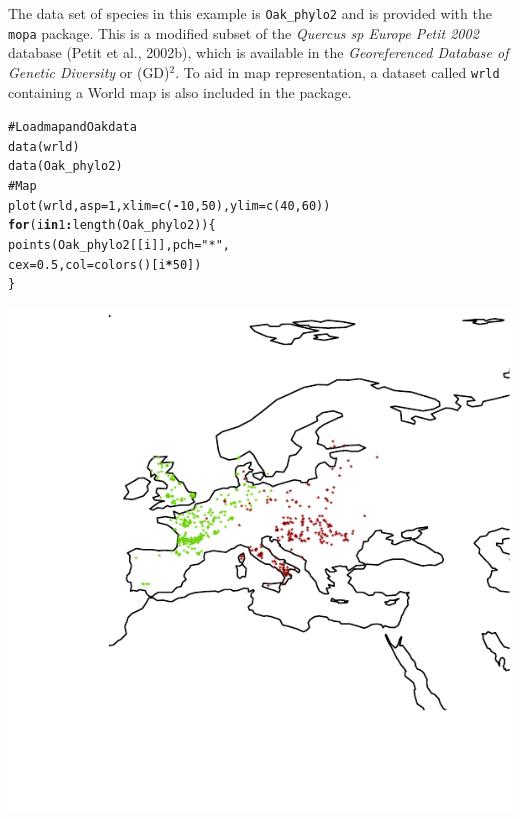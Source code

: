 \documentclass[10pt,a4paper]{article}\usepackage[]{graphicx}\usepackage[]{color}
\makeatletter
\def\maxwidth{ %
  \ifdim\Gin@nat@width>\linewidth
    \linewidth
  \else
    \Gin@nat@width
  \fi
}
\newcommand{\hlnum}[1]{\textcolor[rgb]{0.533,0,0.133}{#1}}%
\newcommand{\hlstr}[1]{\textcolor[rgb]{0.667,0.267,0}{#1}}%
\newcommand{\hlcom}[1]{\textcolor[rgb]{1,0.533,0}{#1}}%
\newcommand{\hlopt}[1]{\textcolor[rgb]{0,0,0}{\textbf{#1}}}%
\newcommand{\hlstd}[1]{\textcolor[rgb]{0,0,0}{#1}}%
\newcommand{\hlkwa}[1]{\textcolor[rgb]{0.4,0.067,0.067}{\textbf{#1}}}%
\newcommand{\hlkwc}[1]{\textcolor[rgb]{0,0,0.4}{#1}}%
\newcommand{\hlkwd}[1]{\textcolor[rgb]{0,0.267,0.4}{#1}}%
\newenvironment{kframe}{%
 \def\at@end@of@kframe{}%
 \ifinner\ifhmode%
  \def\at@end@of@kframe{\end{minipage}}%
  \begin{minipage}{\columnwidth}%
 \fi\fi%
 \def\FrameCommand##1{\hskip\@totalleftmargin \hskip-\fboxsep
 \colorbox{shadecolor}{##1}\hskip-\fboxsep
     \hskip-\linewidth \hskip-\@totalleftmargin \hskip\columnwidth}%
 \MakeFramed {\advance\hsize-\width
   \@totalleftmargin\z@ \linewidth\hsize
   \@setminipage}}%
 {\par\unskip\endMakeFramed%
 \at@end@of@kframe}
\newenvironment{knitrout}{}{} %
\makeatother
\begin{document}
The data set of species in this example is \texttt{Oak\_phylo2} and is provided with the \texttt{mopa} package. This is a modified subset of the \textit{Quercus sp Europe Petit 2002} database (Petit et al., 2002b), which is available in the \textit{Georeferenced Database of Genetic Diversity} or (GD)$^{2}$. To aid in map representation, a dataset called \texttt{wrld} containing a World map is also included in the package.



\begin{knitrout}
\color{fgcolor}\begin{kframe}
\begin{alltt}
\hlcom{# Load map and Oak data}
\hlkwd{data}\hlstd{(wrld)}
\hlkwd{data}\hlstd{(Oak_phylo2)}
\hlcom{# Map }
\hlkwd{plot}\hlstd{(wrld,} \hlkwc{asp} \hlstd{=} \hlnum{1}\hlstd{,} \hlkwc{xlim}\hlstd{=} \hlkwd{c}\hlstd{(}\hlopt{-}\hlnum{10}\hlstd{,}\hlnum{50}\hlstd{),} \hlkwc{ylim}\hlstd{=}\hlkwd{c}\hlstd{(}\hlnum{40}\hlstd{,}\hlnum{60}\hlstd{))}
\hlkwa{for} \hlstd{(i} \hlkwa{in} \hlnum{1}\hlopt{:}\hlkwd{length}\hlstd{(Oak_phylo2)) \{}
  \hlkwd{points}\hlstd{(Oak_phylo2[[i]],} \hlkwc{pch} \hlstd{=} \hlstr{"*"}\hlstd{,}
         \hlkwc{cex} \hlstd{=} \hlnum{0.5}\hlstd{,} \hlkwc{col} \hlstd{=} \hlkwd{colors}\hlstd{()[i}\hlopt{*}\hlnum{50}\hlstd{])}
\hlstd{\}}
\end{alltt}
\end{kframe}

{\centering \includegraphics[width=\maxwidth]{figure/graphics-mopa2-1} 

}



\end{knitrout}
\end{document}
